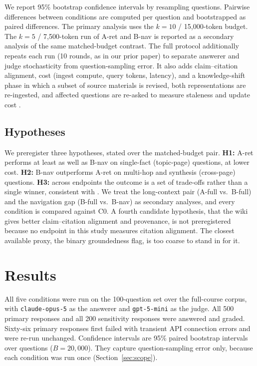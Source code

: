\documentclass[letterpaper]{article} %
\begin{document}
We report 95\% bootstrap confidence intervals by resampling questions. Pairwise differences between conditions are computed per question and bootstrapped as paired differences. The primary analysis uses the $k{=}10$ / 15{,}000-token budget. The $k{=}5$ / 7{,}500-token run of A-ret and B-nav is reported as a secondary analysis of the same matched-budget contrast. The full protocol additionally repeats each run (10 rounds, as in our prior paper) to separate answerer and judge stochasticity from question-sampling error. It also adds claim--citation alignment, cost (ingest compute, query tokens, latency), and a knowledge-shift phase in which a subset of source materials is revised, both representations are re-ingested, and affected questions are re-asked to measure staleness and update cost \citep{jain2025aligning,hou2024wikicontradict}.

\subsection{Hypotheses}

We preregister three hypotheses, stated over the matched-budget pair. \textbf{H1:} A-ret performs at least as well as B-nav on single-fact (topic-page) questions, at lower cost. \textbf{H2:} B-nav outperforms A-ret on multi-hop and synthesis (cross-page) questions. \textbf{H3:} across endpoints the outcome is a set of trade-offs rather than a single winner, consistent with \citet{cochran2026vector}. We treat the long-context pair (A-full vs.\ B-full) and the navigation gap (B-full vs.\ B-nav) as secondary analyses, and every condition is compared against C0. A fourth candidate hypothesis, that the wiki gives better claim--citation alignment and provenance, is not preregistered because no endpoint in this study measures citation alignment. The closest available proxy, the binary groundedness flag, is too coarse to stand in for it.

\section{Results}

All five conditions were run on the 100-question set over the full-course corpus, with \texttt{claude-opus-5} as the answerer and \texttt{gpt-5-mini} as the judge. All 500 primary responses and all 200 sensitivity responses were answered and graded. Sixty-six primary responses first failed with transient API connection errors and were re-run unchanged. Confidence intervals are 95\% paired bootstrap intervals over questions ($B{=}20{,}000$). They capture question-sampling error only, because each condition was run once (Section~\ref{sec:scope}).
\end{document}
